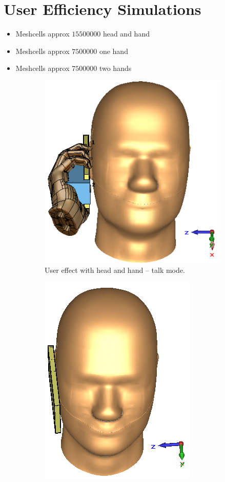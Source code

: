 \chapter{User Efficiency Simulations}


\begin{itemize}
\item Meshcells approx $15500000$ head and hand
\item Meshcells approx $7500000$ one hand
\item Meshcells approx $7500000$ two hands 
\end{itemize}

\begin{figure}[htbp]
    \begin{subfigure}[b]{0.49\linewidth}
        \centering
        \includegraphics{img/tech_sol/usereff_intro/usereff_headhand}
        \caption{User effect with head and hand -- talk mode.}
        \label{fig:usereff_headhand}
    \end{subfigure}
    \hfill
    \begin{subfigure}[b]{0.49\linewidth}
        \centering
        \includegraphics{img/tech_sol/usereff_intro/usereff_sar}

\end{subfigure}
\end{figure}
